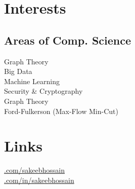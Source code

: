 \documentclass[]{deedy-resume-openfont}
\begin{document}
\begin{minipage}[t]{0.33\textwidth}

\section{Interests}
\subsection{Areas of Comp. Science}
Graph Theory \\
Big Data\\
Machine Learning \\
Security \& Cryptography \\
Graph Theory \\
Ford-Fulkerson (Max-Flow Min-Cut)
\sectionsep



\section{Links} 
\href{https://github.com/sakeebhossain}{.com/sakeebhossain} \\
\href{https://www.linkedin.com/in/sakeebhossain}{.com/in/sakeebhossain} \\
\sectionsep


%
%

\end{minipage} 
\hfill
\end{document}
